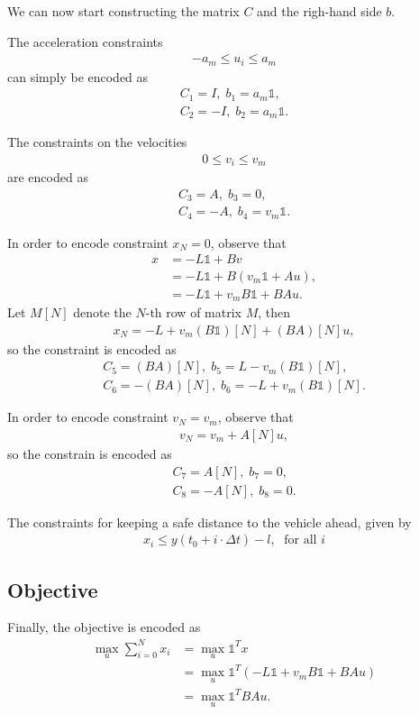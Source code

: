 \documentclass{article}
\theoremstyle{definition}
\theoremstyle{plain}
\begin{document}
We can now start constructing the matrix $C$ and the righ-hand side $b$.

The acceleration constraints
\begin{align*}
  -a_{m} \leq u_{i} \leq a_{m}
\end{align*}
can simply be encoded as
\begin{align*}
  C_{1} = I, \; b_{1} = a_{m} \mathds{1} , \\
  C_{2} = -I, \; b_{2} = a_{m} \mathds{1} .
\end{align*}

The constraints on the velocities
\begin{align*}
  0 \leq v_{i} \leq v_{m}
\end{align*}
are encoded as
\begin{align*}
  C_{3} = A, \; b_{3} = 0 , \\
  C_{4} = -A, \; b_{4} = v_{m} \mathds{1} .
\end{align*}


In order to encode constraint $x_{N} = 0$, observe that
\begin{align*}
  x &= -L \mathds{1} + Bv \\
    &= -L \mathds{1} + B(v_{m} \mathds{1} + Au) , \\
    &= -L \mathds{1} +  v_{m} B \mathds{1} + BA u .
\end{align*}
Let $M[N]$ denote the $N$-th row of matrix $M$, then
\begin{align*}
  x_{N} = -L + v_{m}(B \mathds{1})[N] + (BA)[N]u ,
\end{align*}
so the constraint is encoded as
\begin{align*}
  C_{5} = (BA)[N], \; b_{5} = L - v_{m} (B \mathds{1})[N] , \\
  C_{6} = -(BA)[N], \; b_{6} = -L + v_{m} (B \mathds{1})[N] .
\end{align*}


In order to encode constraint $v_{N} = v_{m}$, observe that
\begin{align*}
  v_{N} = v_{m} + A[N] u ,
\end{align*}
so the constrain is encoded as
\begin{align*}
  C_{7} = A[N], \; b_{7} = 0 , \\
  C_{8} = -A[N], \; b_{8} = 0 .
\end{align*}

The constraints for keeping a safe distance to the vehicle ahead, given by
\begin{align*}
  x_{i} \leq y(t_{0} + i \cdot \Delta t) - l , \; \text{ for all } i
\end{align*}

\subsection*{Objective}

Finally, the objective is encoded as
\begin{align*}
  \max_{u} \sum_{i=0}^{N} x_{i} &= \max_{u} \mathds{1}^{T} x \\
  &= \max_{u} \mathds{1}^{T} (-L \mathds{1} + v_{m}B \mathds{1}  + BAu) \\
  &= \max_{u} \mathds{1}^{T} BA u .
\end{align*}
\end{document}

